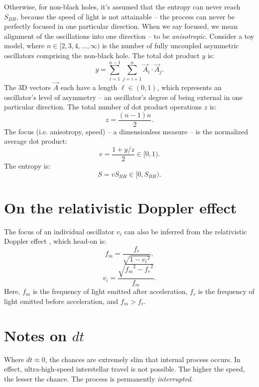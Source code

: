 \documentclass[12pt]{article}
\begin{document}
Otherwise, for non-black holes, it's assumed that the entropy can never reach $S_{BH}$, because the speed of light is not attainable -- the process can never be perfectly focused in one particular direction.
When we say focused, we mean alignment of the oscillations into one direction -- to be \textit{anisotropic}.
Consider a toy model, where $n \in [2, 3, 4, ..., \infty)$ is the number of fully uncoupled asymmetric oscillators comprising the non-black hole.
The total dot product $y$ is:
\begin{equation}
y = \sum_{i = 1}^{n - 1}  \sum_{j = i + 1}^{n} {\vec{A}}_i  \cdot {\vec{A}}_j.
\end{equation}
The 3D vectors ${\vec{A}}$ each have a length $\ell \in (0, 1)$, which represents an oscillator's level of asymmetry -- an oscillator's degree of being external in one particular direction.
The total number of dot product operations $z$ is:
\begin{equation}
z = \frac{(n - 1)n}{2}.
\end{equation}
The focus (i.e. anisotropy, speed) -- a dimensionless measure -- is the normalized average dot product:
\begin{equation}
v = \frac{1 + {y}/{z}}{2} \in [0, 1).
\end{equation}
The entropy is:
\begin{equation}
S = v S_{BH} \in [0,  S_{BH}).
\end{equation}



\section{On the relativistic Doppler effect}

The focus of an individual oscillator $v_i$ can also be inferred from the relativistic Doppler effect \cite{ae}, which head-on is:
\begin{equation}
f_m = \frac{f_r}{\sqrt{1 - {v_i}^2}},
\end{equation}
\begin{equation}
v_i = \frac{\sqrt{{f_m}^2 - {f_r}^2}}{f_m}.
\end{equation}
Here, $f_m$ is the frequency of light emitted after acceleration, $f_r$ is the frequency of light emitted before acceleration, and $f_m > f_r$.





\section{Notes on $dt$}
Where $dt \approx 0$, the chances are extremely slim that internal process occurs.
In effect, ultra-high-speed interstellar travel is not possible.
The higher the speed, the lesser the chance.
The process is permanently \textit{interrupted}.
\end{document}
